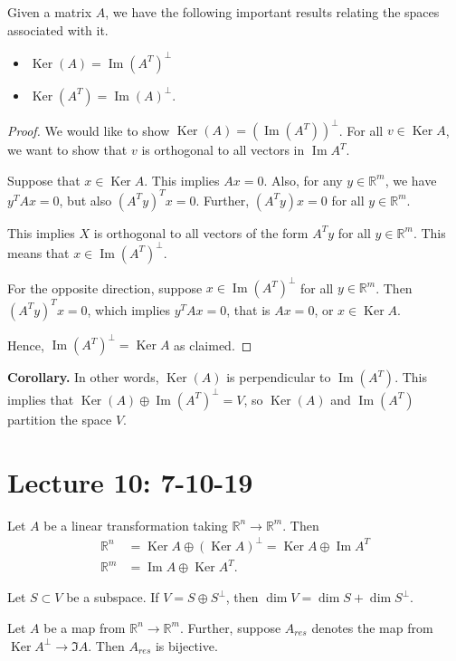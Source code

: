 \documentclass{article}
\newcommand{\RR}{\mathbb{R}}
\DeclareMathOperator{\Ker}{Ker}
\DeclareMathOperator{\Ima}{Im}
\DeclareMathOperator{\Ima}{Im}
\begin{document}
\begin{theorem}
  Given a matrix $A$, we have the following important results relating the spaces associated with it.

  \begin{itemize}
    \item $\Ker(A) = \Ima(A^T)^{\perp}$
    \item $\Ker(A^T) = \Ima (A)^{\perp}$.
  \end{itemize}
\end{theorem}

\begin{proof}
  We would like to show $\Ker(A) = (\Ima(A^T))^{\perp}$.  For all $v \in \Ker A$, we want to show that $v$ is orthogonal to all vectors in $\Ima A^T$.

  Suppose that $x \in \Ker A$.  This implies $Ax = 0$.  Also, for any $y \in \RR^m$, we have $y^T A x = 0$, but also $(A^T y)^T x = 0$.  Further, $(A^T y) x = 0$ for all $y \in \RR^m$.

  This implies $X$ is orthogonal to all vectors of the form $A^T y$ for all $y \in \RR^m$.  This means that $x \in \Ima(A^T)^{\perp}$.

  For the opposite direction, suppose $x \in \Ima(A^T)^{\perp}$ for all $y \in \RR^m$.  Then $(A^T y)^T x = 0$, which implies $y^T A x = 0$, that is $Ax = 0$, or $x \in \Ker A$. 

  Hence, $\Ima(A^T)^{\perp} = \Ker A$ as claimed.
\end{proof}

{\bf Corollary.} In other words, $\Ker(A)$ is perpendicular to $\Ima(A^T)$.  This implies that $\Ker(A) \oplus \Ima(A^T)^{\perp} = V$, so $\Ker(A)$ and $\Ima(A^T)$ partition the space $V$.

\section{Lecture 10: 7-10-19}

Let $A$ be a linear transformation taking $\RR^n \to \RR^m$.  Then
\begin{align*}
  \RR^n &= \Ker A \oplus (\Ker A)^{\perp} = \Ker A \oplus \Ima A^T \\
  \RR^m &= \Ima A \oplus \Ker A^T.
\end{align*}

Let $S \subset V$ be a subspace.  If $V = S \oplus S^{\perp}$, then $\dim V = \dim S + \dim S^{\perp}$.

\begin{theorem}
  Let $A$ be a map from $\RR^n \to \RR^m$.  Further, suppose $A_{res}$ denotes the map from $\Ker A^{\perp} \to \Im A$.  Then $A_{res}$ is bijective.
\end{theorem}
\end{document}
